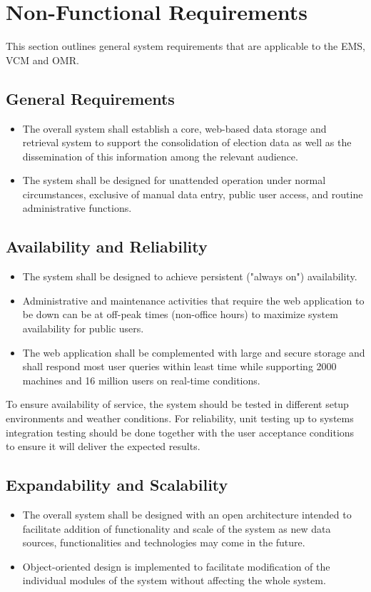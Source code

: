 \documentclass[a4paper, 11pt]{article}
\begin{document}
\section{Non-Functional Requirements}
This section outlines general system requirements that are applicable to the EMS, VCM and OMR.

\subsection{General Requirements}
\begin{itemize}
	\item The overall system shall establish a core, web-based data storage and retrieval system to support the consolidation of election data as well as the dissemination of this information among the relevant audience.
	\item The system shall be designed for unattended operation under normal circumstances, exclusive of manual data entry, public user access, and routine administrative functions.
\end{itemize}

\subsection{Availability and Reliability}
\begin{itemize}
	\item The system shall be designed to achieve persistent ("always on") availability.
	\item Administrative and maintenance activities that require the web application to be down can be at off-peak times (non-office hours) to maximize system availability for public users.
	\item The web application shall be complemented with large and secure storage and shall respond most user queries within least time while supporting 2000 machines and 16 million users on real-time conditions.
\end{itemize}
To ensure availability of service, the system should be tested in different setup environments and weather conditions. For reliability, unit testing up to systems integration testing should be done together with the user acceptance conditions to ensure it will deliver the expected results.

\subsection{Expandability and Scalability}
\begin{itemize}
	\item The overall system shall be designed with an open architecture intended to facilitate addition of functionality and scale of the system as new data sources, functionalities and technologies may come in the future.
	\item Object-oriented design is implemented to facilitate modification of the individual modules of the system without affecting the whole system.
\end{itemize}
\end{document}
